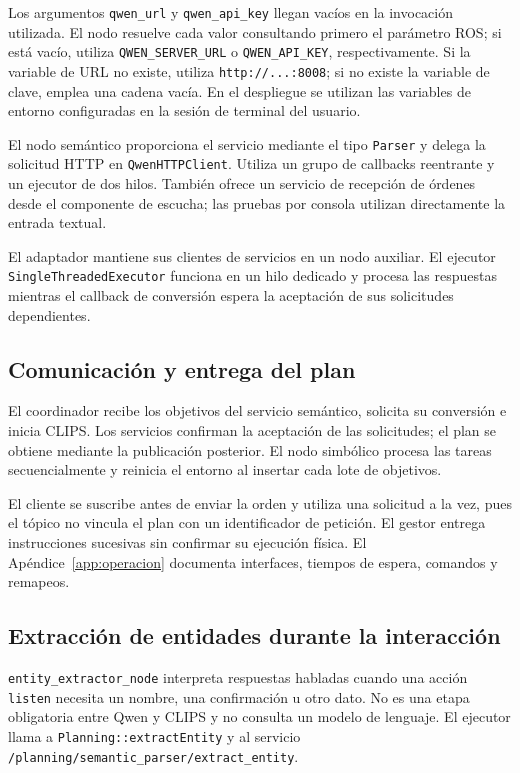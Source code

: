 Los argumentos \texttt{qwen\_url} y \texttt{qwen\_api\_key}
llegan vacíos en la invocación utilizada. El nodo resuelve cada valor
consultando primero el parámetro ROS; si está vacío, utiliza
\texttt{QWEN\_\allowbreak SERVER\_\allowbreak URL} o \texttt{QWEN\_API\_KEY},
respectivamente. Si la variable de URL no existe, utiliza
\texttt{http:/\allowbreak /...:8008}; si no existe la variable de clave,
emplea una cadena vacía. En el despliegue se utilizan las variables
de entorno configuradas en la sesión de terminal del usuario.

El nodo semántico proporciona el servicio mediante el tipo
\texttt{Parser} y delega la solicitud HTTP en
\texttt{Qwen\allowbreak HTTPClient}. Utiliza un grupo de callbacks reentrante
y un ejecutor de dos hilos. También ofrece un servicio de recepción
de órdenes desde el componente de escucha; las pruebas por consola
utilizan directamente la entrada textual.

El adaptador mantiene sus clientes de servicios en un nodo auxiliar.
El ejecutor \texttt{Single\allowbreak Threaded\allowbreak Executor} funciona en un hilo
dedicado y procesa las respuestas mientras el callback de conversión
espera la aceptación de sus solicitudes dependientes.

\subsection{Comunicación y entrega del plan}

El coordinador recibe los objetivos del servicio semántico, solicita su conversión e inicia CLIPS. Los servicios confirman la aceptación de las solicitudes; el plan se obtiene mediante la publicación posterior. El nodo simbólico procesa las tareas secuencialmente y reinicia el entorno al insertar cada lote de objetivos.

El cliente se suscribe antes de enviar la orden y utiliza una solicitud a la vez, pues el tópico no vincula el plan con un identificador de petición. El gestor entrega instrucciones sucesivas sin confirmar su ejecución física. El Apéndice~\ref{app:operacion} documenta interfaces, tiempos de espera, comandos y remapeos.

\subsection{Extracción de entidades durante la interacción}

\texttt{entity\_\allowbreak extractor\_\allowbreak node} interpreta respuestas habladas cuando
una acción \texttt{listen} necesita un nombre, una confirmación u otro
dato. No es una etapa obligatoria entre Qwen y CLIPS y no consulta un
modelo de lenguaje. El ejecutor llama a \texttt{Planning::\allowbreak extract\allowbreak Entity}
y al servicio \texttt{/\allowbreak planning/\allowbreak semantic\_\allowbreak parser/\allowbreak extract\_\allowbreak entity}.

